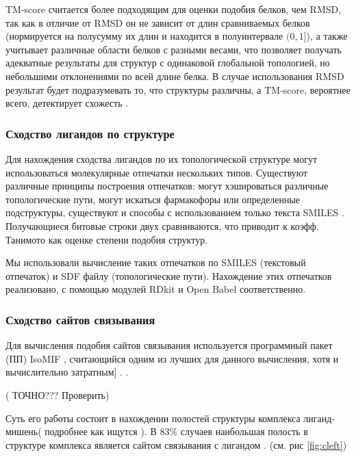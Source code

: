 \documentclass[a4paper,14pt]{article}         %
\newcommand{\sic}[1]{\LARGE\color{orange}{#1}\color{black}\Large}
\begin{document}
TM-score считается более подходящим для оценки подобия белков, чем RMSD, так как в отличие от RMSD он не зависит от длин сравниваемых белков (нормируется на полусумму их длин и находится в полуинтервале $(0, 1]$), а также учитывает различные области белков с разными весами, что позволяет получать адекватные результаты для структур с одинаковой глобальной топологией, но небольшими отклонениями по всей длине белка. В случае использования RMSD результат будет подразумевать то, что структуры различны, а TM-score, вероятнее всего, детектирует схожесть \cite{TMalign}.
\subsubsection{Сходство лигандов по структуре}
Для нахождения сходства лигандов по их топологической структуре могут использоваться молекулярные отпечатки нескольких типов. Существуют различные принципы  построения отпечатков: могут хэшироваться различные топологические пути, могут искаться фармакофоры или определенные подструктуры, существуют и способы с использованием только текста SMILES \cite{Cereto-Massague2015}. Получающиеся битовые строки двух сравниваются, что приводит к коэфф. Танимото как оценке степени подобия структур.

Мы использовали вычисление таких отпечатков по SMILES (текстовый отпечаток) и SDF файлу (топологические пути). Нахождение этих отпечатков реализовано,  с помощью модулей RDkit \cite{rdkit} и Open Babel \cite{openbabel} соответственно. \sic{Не представляет сложности при необходимости добавить другие типы, например фармакофорные отпечатки из тех же модулей.}

\subsubsection{Сходство сайтов связывания}
Для вычисления подобия сайтов связывания используется программный пакет (ПП) IsoMIF \cite{isomif, Chartier2015}, считающийся одним из лучших для данного вычисления, хотя и вычислительно затратным] \cite{Ehrt2016}. .

(\color{orange} ТОЧНО??? Проверить\color{black})

Суть его работы состоит в нахождении полостей структуры комплекса лиганд-мишень\cite{Gaudreault2015}(\color{orange} подробнее как ищутся \color{black}). В 83\% случаев наибольшая полость в структуре комплекса является сайтом связывания с лигандом \cite{Laskowski1995}. (см. рис \ref{fig:cleft})
\end{document}
